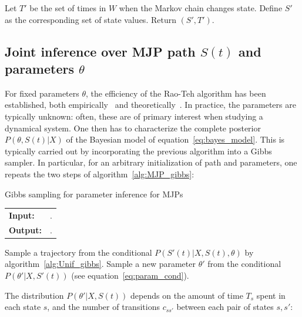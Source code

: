 \begin{algorithm}[H]
\begin{algorithmic}[1]
\begin{description}
\end{description}
    \State Let $T'$ be the set of times in $W$ when the Markov chain changes state. Define $S'$ as the corresponding set of state values. Return $(S', T')$.
\end{algorithmic}
\end{algorithm}

\subsection{Joint inference over MJP path $S(t)$ and parameters $\theta$}
For fixed parameters $\theta$, the efficiency of the Rao-Teh algorithm has been established, both empirically~\citep{RaoTeh13} and theoretically~\citep{miasojedow2017}.
In practice, the parameters are typically unknown: often, these are of primary interest when studying a dynamical system. 
One then has to characterize the complete posterior $P(\theta, S(t)|X)$ of the Bayesian model of equation~\eqref{eq:bayes_model}. 
This is typically carried out by incorporating the previous algorithm into a Gibbs sampler. 
In particular, for an arbitrary initialization of path and  parameters, one repeats the two steps of algorithm~\ref{alg:MJP_gibbs}:
\begin{algorithm}[H]
  \caption{Gibbs sampling for parameter inference for MJPs}
   \label{alg:MJP_gibbs}
  \begin{tabular}{l l}
   \textbf{Input:  } %
                      & \text{The previous MJP path $S(t) = (S, T)$, the previous MJP parameters $\theta$}.\\ 
   \textbf{Output:  }& \text{New MJP trajectory $S' (t) = (S', T')$ and 
                            parameters $\theta'$}.\\
   \hline
   \end{tabular}
   \begin{algorithmic}[1]
  \State  Sample a trajectory from the conditional 
  $P(S'(t)|X,S(t),\theta)$ by 
  algorithm~\ref{alg:Unif_gibbs}.
  \State Sample a new parameter $\theta'$ from the conditional 
  $P(\theta'|X,S'(t))$ (see equation~\eqref{eq:param_cond}).
   \end{algorithmic}
\end{algorithm} 
The distribution $P(\theta'|X,S(t))$ depends on %
the amount of time $T_s$ spent in each state $s$, and the number of transitions $c_{ss'}$ between each pair of states $s,s'$: 

